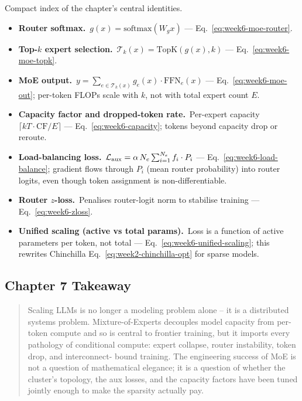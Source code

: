 \begin{derivledger}
Compact index of the chapter's central identities.
\begin{itemize}
  \item \textbf{Router softmax.}\
        $g(x) = \mathrm{softmax}(W_g x)$
        --- Eq.~\eqref{eq:week6-moe-router}.
  \item \textbf{Top-$k$ expert selection.}\
        $\mathcal{T}_k(x) = \mathrm{TopK}(g(x), k)$
        --- Eq.~\eqref{eq:week6-moe-topk}.
  \item \textbf{MoE output.}\
        $y = \sum_{e \in \mathcal{T}_k(x)} g_e(x) \cdot \mathrm{FFN}_e(x)$
        --- Eq.~\eqref{eq:week6-moe-out}; per-token FLOPs scale with $k$,
        not with total expert count $E$.
  \item \textbf{Capacity factor and dropped-token rate.}\
        Per-expert capacity $\lceil k T \cdot \mathrm{CF} / E \rceil$
        --- Eq.~\eqref{eq:week6-capacity}; tokens beyond capacity
        drop or reroute.
  \item \textbf{Load-balancing loss.}\
        $\mathcal{L}_{\rm aux} = \alpha\,N_e \sum_{i=1}^{N_e} f_i \cdot P_i$
        --- Eq.~\eqref{eq:week6-load-balance}; gradient flows
        through $P_i$ (mean router probability) into router logits,
        even though token assignment is non-differentiable.
  \item \textbf{Router $z$-loss.}\
        Penalises router-logit norm to stabilise training
        --- Eq.~\eqref{eq:week6-zloss}.
  \item \textbf{Unified scaling (active vs total params).}\
        Loss is a function of active parameters per token, not total
        --- Eq.~\eqref{eq:week6-unified-scaling}; this rewrites
        Chinchilla Eq.~\eqref{eq:week2-chinchilla-opt} for sparse
        models.
\end{itemize}
\end{derivledger}

\subsection{Chapter 7 Takeaway}

\begin{quote}
Scaling LLMs is no longer a modeling problem alone -- it is a
distributed systems problem. Mixture-of-Experts decouples model
capacity from per-token compute and so is central to frontier
training, but it imports every pathology of conditional compute:
expert collapse, router instability, token drop, and interconnect-
bound training. The engineering success of MoE is not a question of
mathematical elegance; it is a question of whether the cluster's
topology, the aux losses, and the capacity factors have been tuned
jointly enough to make the sparsity actually pay.
\end{quote}
